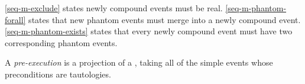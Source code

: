 \ref{seq-m-exclude} states newly compound events must be real.
\ref{seq-m-phantom-forall} states that new phantom events must merge into a
newly compound event.
\ref{seq-m-phantom-exists} states that every newly compound event must have two
corresponding phantom events.


\begin{definition}
  A \cXI{} \emph{pre-execution} is a projection of a \PwTc{}, taking all of
  the simple events whose preconditions are tautologies.
\end{definition}



